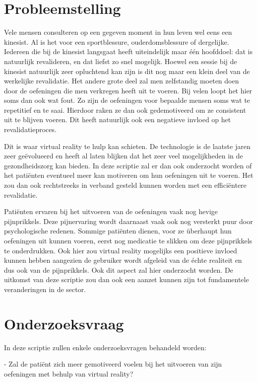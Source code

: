 \section{Probleemstelling}
\label{sec:probleemstelling}
Vele mensen consulteren op een gegeven moment in hun leven wel eens een kinesist. Al is het voor een sportblessure, ouderdomsblessure of dergelijke. Iedereen die bij de kinesist langsgaat heeft uiteindelijk maar één hoofddoel: dat is natuurlijk revalideren, en dat liefst zo snel mogelijk. Hoewel een sessie bij de kinesist natuurlijk zeer opluchtend kan zijn is dit nog maar een klein deel van de werkelijke revalidatie. Het andere grote deel zal men zelfstandig moeten doen door de oefeningen die men verkregen heeft uit te voeren. Bij velen loopt het hier soms dan ook wat fout. Zo zijn de oefeningen voor bepaalde mensen soms wat te repetitief en te saai. Hierdoor raken ze dan ook gedemotiveerd om ze consistent uit te blijven voeren. Dit heeft natuurlijk ook een negatieve invloed op het revalidatieproces. 

Dit is waar virtual reality te hulp kan schieten. De technologie is de laatste jaren zeer geëvolueerd en heeft al laten blijken dat het zeer veel mogelijkheden in de gezondheidszorg kan bieden. In deze scriptie zal er dan ook onderzocht worden of het patiënten eventueel meer kan motiveren om hun oefeningen uit te voeren. Het zou dan ook rechtstreeks in verband gesteld kunnen worden met een efficiëntere revalidatie.

Patiënten ervaren bij het uitvoeren van de oefeningen vaak nog hevige pijnprikkels. Deze pijnervaring wordt daarnaast vaak ook nog versterkt puur door psychologische redenen. Sommige patiënten dienen, voor ze überhaupt hun oefeningen uit kunnen voeren, eerst nog medicatie te slikken om deze pijnprikkels te onderdrukken. Ook hier zou virtual reality mogelijks een positieve invloed kunnen hebben aangezien de gebruiker wordt afgeleid van de échte realiteit en dus ook van de pijnprikkels. Ook dit aspect zal hier onderzocht worden. De uitkomst van deze scriptie zou dan ook een aanzet kunnen zijn tot fundamentele veranderingen in de sector.


\section{Onderzoeksvraag}
\label{sec:onderzoeksvraag}

In deze scriptie zullen enkele onderzoeksvragen behandeld worden:

- Zal de patiënt zich meer gemotiveerd voelen bij het uitvoeren van zijn oefeningen met behulp van virtual reality?

